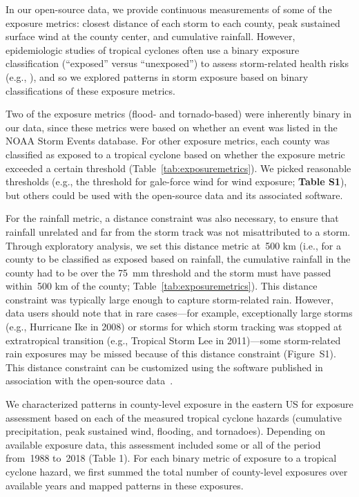In our open-source data, we provide continuous measurements of some of the
exposure metrics: closest distance of each storm to each county, peak sustained
surface wind at the county center, and cumulative rainfall. However,
epidemiologic studies of tropical cyclones often use a binary exposure
classification (``exposed'' versus ``unexposed'') to assess storm-related
health risks (e.g., \textcite{grabich2015, mckinney2011,
caillouet2008increase}), and so we explored patterns in storm exposure based on
binary classifications of these exposure metrics. 

Two of the exposure metrics (flood- and tornado-based) were inherently binary
in our data, since these metrics were based on whether an event was listed in
the NOAA Storm Events database.  For other exposure metrics, each county was
classified as exposed to a tropical cyclone based on whether the exposure
metric exceeded a certain threshold (Table~\ref{tab:exposuremetrics}). We
picked reasonable thresholds (e.g., the threshold for gale-force wind for wind
exposure; \textbf{Table S1}), but others could be used with the open-source data and its
associated software. 

For the rainfall metric, a distance constraint was also necessary, to ensure
that rainfall unrelated and far from the storm track was not misattributed to a
storm. Through exploratory analysis, we set this distance metric at~500
\si{\kilo\metre} (i.e., for a county to be classified as exposed based on
rainfall, the cumulative rainfall in the county had to be over the
75~\si{\milli\metre} threshold and the storm must have passed
within~500 \si{\kilo\metre} of the county; Table~\ref{tab:exposuremetrics}).
This distance constraint was typically large enough to capture storm-related
rain.  However, data users should note that in rare cases---for example,
exceptionally large storms (e.g., Hurricane Ike in 2008) or storms for which
storm tracking was stopped at extratropical transition (e.g., Tropical Storm
Lee in 2011)---some storm-related rain exposures may be missed because of this
distance constraint (Figure~S1). This distance constraint can be customized
using the software published in association with the open-source
data~\parencite{hurricaneexposure}.

We characterized patterns in county-level exposure in the eastern \ac{US} for
exposure assessment based on each of the measured tropical cyclone hazards
(cumulative precipitation, peak sustained wind, flooding, and tornadoes).
Depending on available exposure data, this assessment included some or all of
the period from~1988 to~2018 (Table 1). For each binary metric of exposure to a
tropical cyclone hazard, we first summed the total number of county-level
exposures over available years and mapped patterns in
these exposures. 

